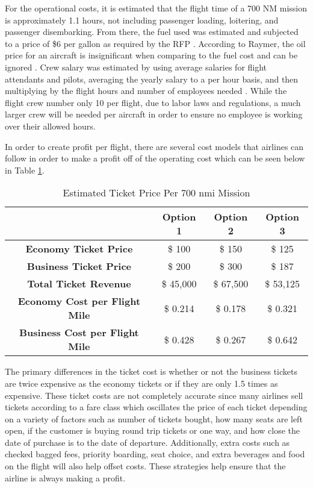 For the operational costs, it is estimated that the flight time of a 700 NM mission is approximately 1.1 hours, not including passenger loading, loitering, and passenger disembarking. From there, the fuel used was estimated and subjected to a price of \$6 per gallon as required by the RFP \cite{RFP}. According to Raymer, the oil price for an aircraft is insignificant when comparing to the fuel cost and can be ignored \cite{raymer}. Crew salary was estimated by using average salaries for flight attendants and pilots, averaging the yearly salary to a per hour basis, and then multiplying by the flight hours and number of employees needed \cite{pilotsalary} \cite{flightsalary}. While the flight crew number only 10 per flight, due to labor laws and regulations, a much larger crew will be needed per aircraft in order to ensure no employee is working over their allowed hours. 

In order to create profit per flight, there are several cost models that airlines can follow in order to make a profit off of the operating cost which can be seen below in Table \ref{tab:tickets}.

\begin{table}[!h]
    \centering
        \caption{Estimated Ticket Price Per 700 nmi Mission}
    \begin{tabular}{|c||c|c|c|}\toprule
         & \textbf{Option 1} & \textbf{Option 2} & \textbf{Option 3} \\\hline \hline
         \textbf{Economy Ticket Price} & \$ 100 & \$ 150 & \$ 125 \\ \hline
         \textbf{Business Ticket Price} & \$ 200 & \$ 300 & \$ 187  \\ \hline
         \textbf{Total Ticket Revenue} & \$ 45,000 & \$ 67,500 & \$ 53,125 \\ \hline
         \textbf{Economy Cost per Flight Mile} &  \$ 0.214 &  \$ 0.178 &  \$ 0.321 \\ \hline
         \textbf{Business Cost per Flight Mile} &  \$ 0.428 &  \$ 0.267 &  \$ 0.642 \\\bottomrule
    \end{tabular}
    \label{tab:tickets}
\end{table}

The primary differences in the ticket cost is whether or not the business tickets are twice expensive as the economy tickets or if they are only 1.5 times as expensive. These ticket costs are not completely accurate since many airlines sell tickets according to a fare class which oscillates the price of each ticket depending on a variety of factors such as number of tickets bought, how many seats are left open, if the customer is buying round trip tickets or one way, and how close the date of purchase is to the date of departure. Additionally, extra costs such as checked bagged fees, priority boarding, seat choice, and extra beverages and food on the flight will also help offset costs. These strategies help ensure that the airline is always making a profit.

